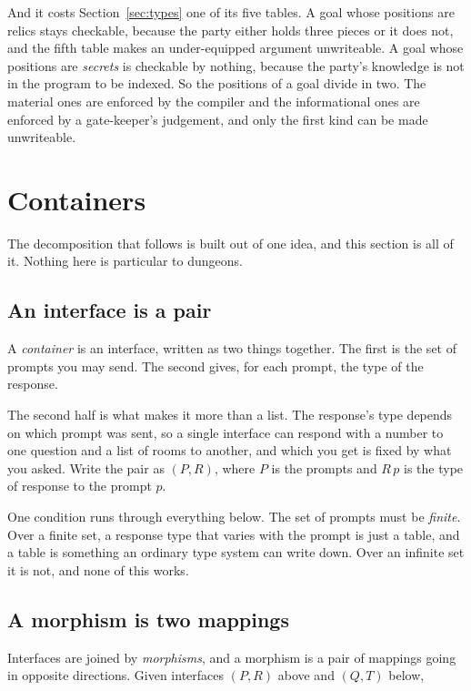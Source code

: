 \documentclass[11pt,a4paper]{article}
\begin{document}
\begin{alarmbox}
And it costs Section~\ref{sec:types} one of its five tables. A goal whose positions are relics stays
checkable, because the party either holds three pieces or it does not, and the fifth table makes an
under-equipped argument unwriteable. A goal whose positions are \emph{secrets} is checkable by
nothing, because the party's knowledge is not in the program to be indexed. So the positions of a
goal divide in two. The material ones are enforced by the compiler and the informational ones are
enforced by a gate-keeper's judgement, and only the first kind can be made unwriteable.
\end{alarmbox}


\section{Containers}
\label{sec:containers}

The decomposition that follows is built out of one idea, and this section is all of it. Nothing
here is particular to dungeons.

\subsection{An interface is a pair}

A \emph{container} is an interface, written as two things together. The first is the set of
prompts you may send. The second gives, for each prompt, the type of the response.

The second half is what makes it more than a list. The response's type depends on which prompt was
sent, so a single interface can respond with a number to one question and a list of rooms to
another, and which you get is fixed by what you asked. Write the pair as $(P, R)$, where $P$ is
the prompts and $R\,p$ is the type of response to the prompt $p$.

One condition runs through everything below. The set of prompts must be \emph{finite}. Over a
finite set, a response type that varies with the prompt is just a table, and a table is something an
ordinary type system can write down. Over an infinite set it is not, and none of this works.

\subsection{A morphism is two mappings}

Interfaces are joined by \emph{morphisms}, and a morphism is a pair of mappings going in opposite
directions. Given interfaces $(P, R)$ above and $(Q, T)$ below,
\end{document}
